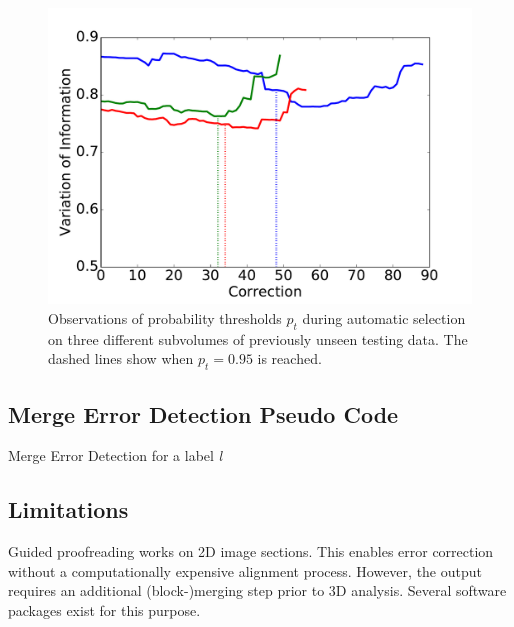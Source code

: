\begin{figure}[t]
\centering
\includegraphics[width=\linewidth]{gfx/ptplot.pdf}
\caption{Observations of probability thresholds $p_t$ during automatic selection on three different subvolumes of previously unseen testing data. The dashed lines show when $p_t=0.95$ is reached.}
\label{fig:cylboxplot}
\end{figure}

\subsection{Merge Error Detection Pseudo Code}

\begin{algorithm}[H]
\caption{Merge Error Detection for a label \emph{l}}\label{code:mergeerror}
\begin{algorithmic}[1]
	\EndFor

\end{algorithmic}
\end{algorithm}

\subsection{Limitations}
Guided proofreading works on 2D image sections. This enables error correction without a computationally expensive alignment process. However, the output requires an additional (block-)merging step prior to 3D analysis. Several software packages exist for this purpose.

